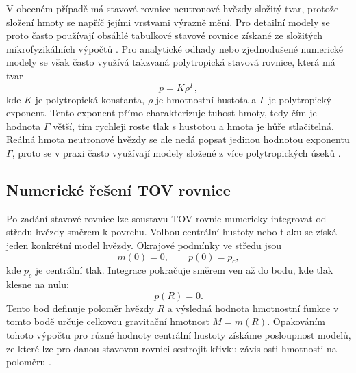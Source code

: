 \documentclass[%
final%
,htext%
]{ipothes}
\begin{document}
V obecném případě má stavová rovnice neutronové hvězdy složitý tvar, protože složení hmoty se napříč jejími vrstvami výrazně mění. Pro detailní modely se proto často používají obsáhlé tabulkové stavové rovnice získané ze složitých mikrofyzikálních výpočtů \cite{baym2018}. Pro analytické odhady nebo zjednodušené numerické modely se však často využívá takzvaná polytropická stavová rovnice, která má tvar
\begin{equation}
    p = K \rho^\Gamma,
    \label{eq:polytropic_eos_rho}
\end{equation}
kde $K$ je polytropická konstanta, $\rho$ je hmotnostní hustota a $\Gamma$ je polytropický exponent. Tento exponent přímo charakterizuje tuhost hmoty, tedy čím je hodnota $\Gamma$ větší, tím rychleji roste tlak s hustotou a hmota je hůře stlačitelná. Reálná hmota neutronové hvězdy se ale nedá popsat jedinou hodnotou exponentu $\Gamma$, proto se v praxi často využívají modely složené z více polytropických úseků \cite{baym2018}.

\subsection{Numerické řešení TOV rovnice}
Po zadání stavové rovnice lze soustavu TOV rovnic numericky integrovat od středu hvězdy směrem k povrchu. Volbou centrální hustoty nebo tlaku se získá jeden konkrétní model hvězdy. Okrajové podmínky ve středu jsou
\begin{equation}
    m(0)=0,
    \qquad
    p(0)=p_c,
    \label{eq:tov_boundary_center}
\end{equation}
kde $p_c$ je centrální tlak. Integrace pokračuje směrem ven až do bodu, kde tlak klesne na nulu:
\begin{equation}
    p(R)=0.
    \label{eq:tov_surface}
\end{equation}
Tento bod definuje poloměr hvězdy $R$ a výsledná hodnota hmotnostní funkce v tomto bodě určuje celkovou gravitační hmotnost $M = m(R)$. Opakováním tohoto výpočtu pro různé hodnoty centrální hustoty získáme posloupnost modelů, ze které lze pro danou stavovou rovnici sestrojit křivku závislosti hmotnosti na poloměru \cite{ghosh2007}.
\end{document}
